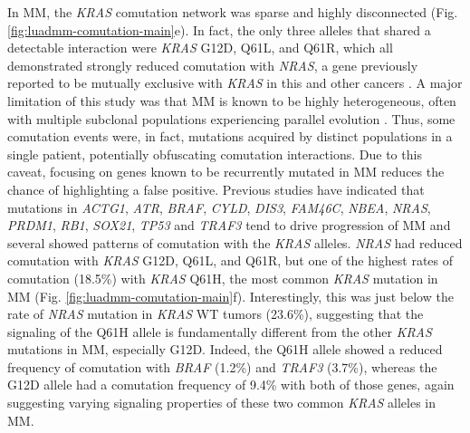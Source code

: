 \documentclass[english, 10pt, letterpaper]{article}
\newcommand{\KRAS}{\emph{KRAS}}
\begin{document}
In MM, the \KRAS{} comutation network was sparse and highly disconnected (Fig. \ref{fig:luadmm-comutation-main}e).
In fact, the only three alleles that shared a detectable interaction were \KRAS{} G12D, Q61L, and Q61R, which all demonstrated strongly reduced comutation with \emph{NRAS}, a gene previously reported to be mutually exclusive with \KRAS{} in this and other cancers \cite{Lohr2014WidespreadTherapy.}.
A major limitation of this study was that MM is known to be highly heterogeneous, often with multiple subclonal populations experiencing parallel evolution \cite{Lohr2014WidespreadTherapy., Melchor2014Single-cellMyeloma., Lionetti2015MolecularActivation., Keats2012ClonalMyeloma., Corre2015GeneticsLevel, Lohr2016GeneticResolution., Xu2017MolecularActivation.}.
Thus, some comutation events were, in fact, mutations acquired by distinct populations in a single patient, potentially obfuscating comutation interactions.
Due to this caveat, focusing on genes known to be recurrently mutated in MM reduces the chance of highlighting a false positive. 
Previous studies have indicated that mutations in \emph{ACTG1}, \emph{ATR}, \emph{BRAF}, \emph{CYLD}, \emph{DIS3}, \emph{FAM46C}, \emph{NBEA}, \emph{NRAS}, \emph{PRDM1}, \emph{RB1}, \emph{SOX21}, \emph{TP53} and \emph{TRAF3} tend to drive progression of MM \cite{Sondka2018, Lohr2014WidespreadTherapy.} and several showed patterns of comutation with the \KRAS{} alleles.
\emph{NRAS} had reduced comutation with \KRAS{} G12D, Q61L, and Q61R, but one of the highest rates of comutation (18.5\%) with \KRAS{} Q61H, the most common \KRAS{} mutation in MM (Fig. \ref{fig:luadmm-comutation-main}f).
Interestingly, this was just below the rate of \emph{NRAS} mutation in \KRAS{} WT tumors (23.6\%), suggesting that the signaling of the Q61H allele is fundamentally different from the other \KRAS{} mutations in MM, especially G12D.
Indeed, the Q61H allele showed a reduced frequency of comutation with \emph{BRAF} (1.2\%) and \emph{TRAF3} (3.7\%), whereas the G12D allele had a comutation frequency of 9.4\% with both of those genes, again suggesting varying signaling properties of these two common \KRAS{} alleles in MM.
\end{document}
